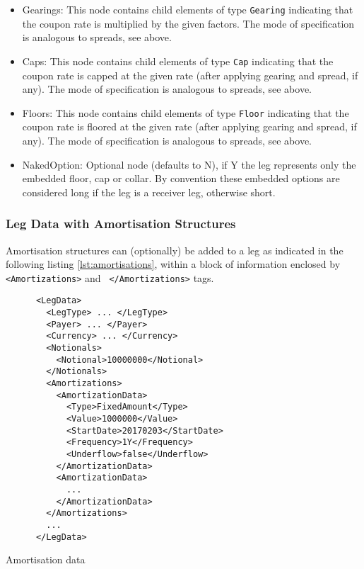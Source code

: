 \begin{itemize}
\item Gearings: This node contains child elements of type \lstinline!Gearing! indicating that the coupon rate is
  multiplied by the given factors. The mode of specification is analogous to spreads, see above.

\item Caps: This node contains child elements of type \lstinline!Cap! indicating that the coupon rate is capped at the
  given rate (after applying gearing and spread, if any). The mode of specification is analogous to spreads, see above.

\item Floors: This node contains child elements of type \lstinline!Floor! indicating that the coupon rate is floored at
  the given rate (after applying gearing and spread, if any). The mode of specification is analogous to spreads, see
  above.

\item NakedOption: Optional node (defaults to N), if Y the leg represents only the embedded floor, cap or collar. 
By convention these embedded options are considered long if the leg is a receiver leg, otherwise short. 

\end{itemize}

\subsubsection{Leg Data with Amortisation Structures}
\label{ss:amortisationdata}

Amortisation structures can (optionally) be added to a leg as
indicated in the following listing \ref{lst:amortisations}, within a
block of information enclosed by {\tt <Amortizations>} and {\tt
  </Amortizations>} tags.

\begin{listing}[H]
\begin{verbatim}
      <LegData>
        <LegType> ... </LegType>
        <Payer> ... </Payer>
        <Currency> ... </Currency>
        <Notionals>
          <Notional>10000000</Notional>
        </Notionals>
        <Amortizations>
          <AmortizationData>
            <Type>FixedAmount</Type>
            <Value>1000000</Value>
            <StartDate>20170203</StartDate>
            <Frequency>1Y</Frequency>
            <Underflow>false</Underflow>
          </AmortizationData>
          <AmortizationData>
            ...
          </AmortizationData>
        </Amortizations>
        ...
      </LegData>
\end{verbatim}
\caption{Amortisation data}
\label{lst:amortisations}
\end{listing}

